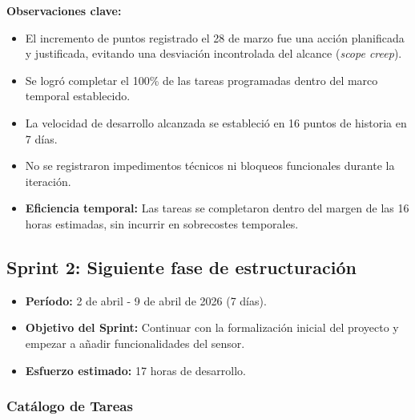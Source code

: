 
\noindent\textbf{Observaciones clave:}
\begin{itemize}
    \item El incremento de puntos registrado el 28 de marzo fue una acción planificada y justificada, evitando una desviación incontrolada del alcance (\textit{scope creep}).
    \item Se logró completar el 100\% de las tareas programadas dentro del marco temporal establecido.
    \item La velocidad de desarrollo alcanzada se estableció en 16 puntos de historia en 7 días.
    \item No se registraron impedimentos técnicos ni bloqueos funcionales durante la iteración.
    \item \textbf{Eficiencia temporal:} Las tareas se completaron dentro del margen de las 16 horas estimadas, sin incurrir en sobrecostes temporales.
\end{itemize}

\subsection{Sprint 2: Siguiente fase de estructuración}

\begin{itemize}
    \item \textbf{Período:} 2 de abril - 9 de abril de 2026 (7 días).
    \item \textbf{Objetivo del Sprint:} Continuar con la formalización inicial del proyecto y empezar a añadir funcionalidades del sensor.
    \item \textbf{Esfuerzo estimado:} 17 horas de desarrollo.
\end{itemize}

\subsubsection{Catálogo de Tareas}

